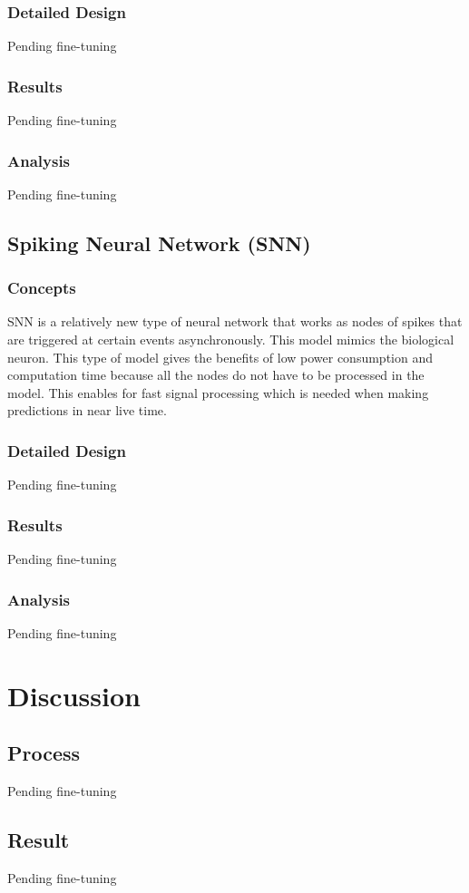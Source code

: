 \documentclass[12pt,titlepage]{article}
\begin{document}
\subsubsection{Detailed Design}
Pending fine-tuning
\subsubsection{Results}
Pending fine-tuning
\subsubsection{Analysis}
Pending fine-tuning
\subsection{Spiking Neural Network (SNN)}
\subsubsection{Concepts}
SNN is a relatively new type of neural network that works as nodes of spikes that are triggered at certain events asynchronously. This model mimics the biological neuron. This type of model gives the benefits of low power consumption and computation time because all the nodes do not have to be processed in the model. This enables for fast signal processing which is needed when making predictions in near live time.
\subsubsection{Detailed Design}
Pending fine-tuning
\subsubsection{Results}
Pending fine-tuning
\subsubsection{Analysis}
Pending fine-tuning
\section{Discussion}
\subsection{Process}
Pending fine-tuning
\subsection{Result}
Pending fine-tuning
\end{document}

